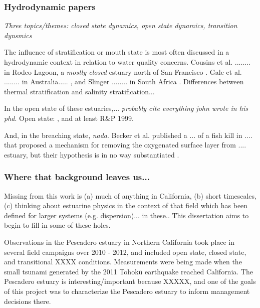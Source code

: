 \subsubsection{Hydrodynamic papers}
\emph{Three topics/themes: closed state dynamics, open state dynamics, transition dynsmics}


The influence of stratification or mouth state is most often discussed in a hydrodynamic context in relation to water quality concerns. Cousins et al. ........ in Rodeo Lagoon, a \emph{mostly closed} estuary north of San Francisco \parencite*{cousins_effects_2010}. Gale et al. ........ in Australia..... \parencite*{gale_vertical_2006}, and Slinger ........ in South Africa \parencite*{slinger_evolution_1990}. Differences between thermal stratification and salinity stratification... 

In the open state of these estuaries,... \emph{probably cite everything john wrote in his phd}. Open state: \parencite{largier_dynamics_1991}, and at least R\&P 1999. 


And, in the breaching state, \emph{nada}. Becker et al. published a ... of a fish kill in .... that proposed a mechanism for removing the oxygenated surface layer from .... estuary, but their hypothesis is in no way substantiated \parencite*{becker_artificial_2009}.




\subsubsection{Where that background leaves us...}

Missing from this work is (a) much of anything in California, (b) short timescales, (c) thinking about estuarine physics in the context of that field which has been defined for larger systems (e.g. dispersion)... in these.. This dissertation aims to begin to fill in some of these holes. 

Observations in the Pescadero estuary in Northern California took place in several field campaigns over 2010 - 2012, and included open state, closed state, and transitional XXXX conditions. Measurements were being made when the small tsunami generated by the 2011 Tohok$\overline{\mathrm{u}}$ earthquake reached California. The Pescadero estuary is interesting/important because XXXXX, and one of the goals of this project was to characterize the Pescadero estuary to inform management decisions there. 

